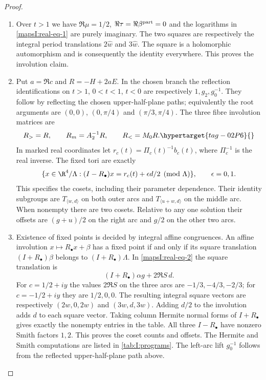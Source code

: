 \begin{proof}
\begin{enumerate}[label=\arabic*.,leftmargin=*]
\item Over $t>1$ we have
$\Re\mu=1/2$, $\Re\tau=\Re\beta^{\rm part}=0$ and the logarithms in
\eqref{mapsI:real-eq-1} are purely imaginary. The two squares are respectively the
integral period translations $2\widehat w$ and $3\widehat w$.
The square is a holomorphic automorphism and is consequently the
identity everywhere. This proves the involution claim.

\item  Put $a=\Re c$ and
$R=-H+2aE$. In the chosen branch the reflection identifications on
$t>1$, $0<t<1$, $t<0$ are respectively $1,g_2,g_0^{-1}$.
They follow by reflecting the chosen upper-half-plane paths; equivalently
the root arguments are $(0,0)$, $(0,\pi/4)$ and $(\pi/3,\pi/4)$.
The three fibre involution matrices are
\begin{equation}
 R_>=R,\qquad R_m=A_2^{-1}R,\qquad R_<=M_0R.
 \hypertarget{tag-02P6}{}\label{mapsI:real-eq-5}
\end{equation}
In marked real coordinates let $r_c(t)=\Pi_c(t)^{-1}b_c(t)$,
where $\Pi_c^{-1}$ is the real inverse. The fixed tori are exactly
\begin{equation}
 \{x\in\R^4/\Lambda:(I-R_\bullet)x=
                       r_c(t)+\epsilon d/2\pmod\Lambda\},
 \qquad\epsilon=0,1.
 \label{mapsI:real-eq-6}
\end{equation}
This specifies the cosets, including their parameter dependence. Their
identity subgroups are $T_{\langle w,d\rangle}$ on both outer arcs and
$T_{\langle u+w,d\rangle}$ on the middle arc. When nonempty there are
two cosets. Relative to any one solution their offsets are
$(g+u)/2$ on the right arc and $g/2$ on the other two arcs.

\item Existence of fixed points is decided by integral affine congruences. An affine involution
$x\mapsto R_\bullet x+\beta$ has a fixed point if and only if its
square translation $(I+R_\bullet)\beta$ belongs to
$(I+R_\bullet)\Lambda$. In \eqref{mapsI:real-eq-2} the square translation is
\[
 (I+R_\bullet)\alpha g+2\Re S\,d.
\]
For $c=1/2+iy$ the values $2\Re S$ on the three arcs are
$-1/3,-4/3,-2/3$; for $c=-1/2+iy$ they are $1/2,0,0$.
The resulting integral square vectors are respectively
$(2w,0,2w)$ and $(3w,d,3w)$. Adding $d/2$ to the involution adds $d$
to each square vector. Taking column Hermite normal forms of
$I+R_\bullet$ gives exactly the nonempty entries in the table.
All three $I-R_\bullet$ have nonzero Smith factors $1,2$.
This proves the coset counts and offsets. The Hermite and Smith
computations are listed in \cref{tab:I:programs}. The left-arc lift
$g_0^{-1}$ follows from the reflected upper-half-plane path above.


\end{enumerate}
\end{proof}
